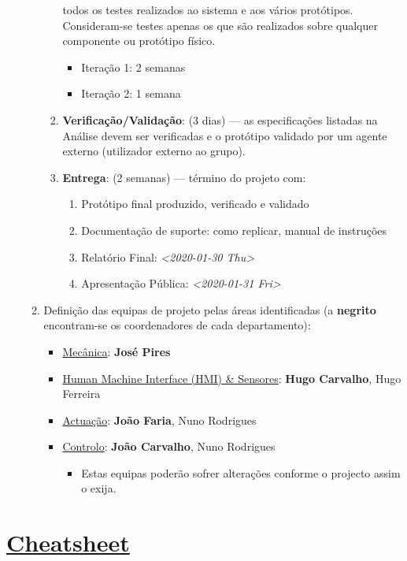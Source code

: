 \documentclass[11pt]{article}
\begin{document}
\begin{enumerate}
\begin{enumerate}
\begin{enumerate}
todos os testes realizados ao sistema e aos vários
protótipos. Consideram-se testes apenas os que são realizados sobre
qualquer componente ou protótipo físico.
\begin{itemize}
\item Iteração 1: 2 semanas
\item Iteração 2: 1 semana
\end{itemize}
\item \textbf{Verificação/Validação}: (3 dias) --- as especificações listadas na
Análise devem ser verificadas e o protótipo validado por um agente externo
(utilizador externo ao grupo).
\item \textbf{Entrega}: (2 semanas) --- término do projeto com:
\begin{enumerate}
\item Protótipo final produzido, verificado e validado
\item Documentação de suporte: como replicar, manual de instruções
\item Relatório Final: \textit{<2020-01-30 Thu>}
\item Apresentação Pública: \textit{<2020-01-31 Fri>}
\end{enumerate}
\end{enumerate}
\item Definição das equipas de projeto pelas áreas identificadas (a \textbf{negrito}
encontram-se os coordenadores de cada departamento):
\begin{itemize}
\item \uline{Mecânica}: \textbf{José Pires}
\item \uline{Human Machine Interface (HMI) \& Sensores}: \textbf{Hugo Carvalho}, Hugo Ferreira
\item \uline{Actuação}: \textbf{João Faria}, Nuno Rodrigues
\item \uline{Controlo}: \textbf{João Carvalho}, Nuno Rodrigues
\begin{itemize}
\item Estas equipas poderão sofrer alterações conforme o projecto assim o
exija.
\end{itemize}
\end{itemize}
\end{enumerate}
\end{enumerate}

\section{\href{/Users/zemiguel/Documents/Univ/MI\_Electro/Sem6/LPI2/PI/github/Deliverables/Final/sec/cheatsheet.pdf::3}{Cheatsheet}}
\label{sec:orgead43b2}
\end{document}
